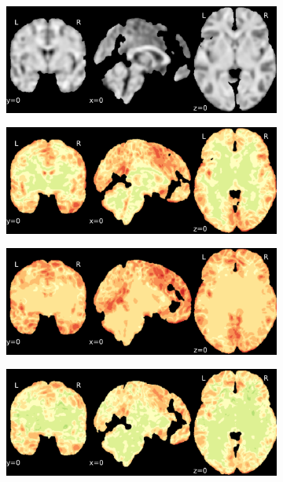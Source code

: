 \documentclass{article}
\begin{document}
\begin{landscape}
\begin{figure}
        \begin{subfigure}[t]{0.2\paperheight}
            \centering
            \includegraphics[width=\textwidth]{figures/ieee_T1/fwhm_5/ieee_ds000256_sub-CTS210.pdf}
        \end{subfigure}
        \begin{subfigure}[t]{0.2\paperheight}
            \centering
            \includegraphics[width=\textwidth]{figures/sig/fwhm_5/rr_ds000256_sub-CTS210_sig.pdf}
        \end{subfigure}
        \begin{subfigure}[t]{0.2\paperheight}
            \centering
            \includegraphics[width=\textwidth]{figures/sig/fwhm_5/rs_ds000256_sub-CTS210_sig.pdf}
        \end{subfigure}
        \begin{subfigure}[t]{0.2\paperheight}
            \centering
            \includegraphics[width=\textwidth]{figures/sig/fwhm_5/rr.rs_ds000256_sub-CTS210_sig.pdf}

\end{subfigure}
\end{figure}
\end{landscape}
\end{document}

